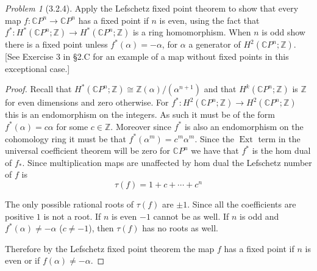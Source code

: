 \documentclass[10pt]{article}
\newcommand{\sk}{\vskip 10mm}
\newcommand{\bb}[1]{\mathbb{#1}}
\DeclareMathOperator{\Ext}{Ext}
\theoremstyle{remark}
\newtheorem{problem}{Problem}
\begin{document}
\sk

\begin{problem}[3.2.4]
  Apply the Lefschetz fixed point theorem to show that every map
  $f:\bb{C}P^n\rightarrow\bb{C}P^n$ has a fixed point if $n$ is even, using
  the fact that $f^*:H^*(\bb{C}P^n;\bb{Z})\rightarrow H^*(\bb{C}P^n;\bb{Z})$
  is a ring homomorphism. When $n$ is odd show there is a fixed point unless
  $f^*(\alpha)=-\alpha$, for $\alpha$ a generator of $H^2(\bb{C}P^n;\bb{Z})$.
  [See Exercise 3 in \S 2.C for an example of a map without fixed points in
  this exceptional case.]
\end{problem}

\begin{proof}
  Recall that $H^*(\bb{C}P^n;\bb{Z})\cong\bb{Z}(\alpha)/(\alpha^{n+1})$ and that
  $H^k(\bb{C}P^n;\bb{Z})$ is $\bb{Z}$ for even dimensions and zero otherwise. For
  $f^*:H^2(\bb{C}P^n;\bb{Z})\rightarrow H^2(\bb{C}P^n;\bb{Z})$ this is an endomorphism on the integers.
  As such it must be of the form $f^*(\alpha)=c\alpha$ for some $c\in\bb{Z}$. Moreover since
  $f^*$ is also an endomorphism on the cohomology ring it must be that
  $f^*(\alpha^m)=c^m\alpha^m$. Since the $\Ext$ term in the universal coefficient theorem
  will be zero for $\bb{C}P^n$ we have that $f^*$ is the hom dual of $f_*$.
  Since multiplication maps are unaffected by hom dual the Lefschetz number of
  $f$ is
  \[
    \tau(f)= 1+c+\cdots+c^n
  \]

  The only possible rational roots of $\tau(f)$ are $\pm 1$. Since all the coefficients
  are positive $1$ is not a root. If $n$ is even $-1$ cannot be as well. If
  $n$ is odd and $f^*(\alpha)\neq-\alpha$ ($c\neq -1$), then $\tau(f)$ has no roots as well.

  Therefore by the Lefschetz fixed point theorem the map $f$ has a fixed point if
  $n$ is even or if $f(\alpha)\neq -\alpha$.
\end{proof}
\end{document}
